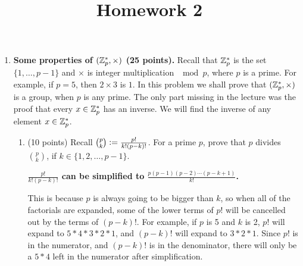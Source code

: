 \documentclass[11pt]{article}
\begin{document}
\title{Homework 2}

\date{}

\maketitle 

\thispagestyle{fancy}  
\pagestyle{fancy}      



\begin{enumerate}
\item {\bfseries Some properties of $({\mathbb Z}_p^*,\times)$ (25 points).} 
  Recall that ${\mathbb Z}_p^*$ is the set $\{1,\dotsc,p-1\}$ and $\times$ is integer multiplication $\mod p$, where $p$ is a prime. 
  For example, if $p=5$, then $2\times 3$ is $1$. 
  In this problem we shall prove that $({\mathbb Z}_p^*,\times)$ is a group, when $p$ is any prime. 
  The only part missing in the lecture was the proof that every $x\in{\mathbb Z}_p^*$ has an inverse. 
  We will find the inverse of any element $x\in{\mathbb Z}_p^*$. 
  \begin{enumerate}
  \item(10 points) Recall $\binom pk {\;\vcentcolon=\;} \frac{p!}{k!(p-k)!}$. 
    For a prime $p$, prove that $p$ divides $\binom pk$, if $k\in\{1,2,\dotsc,p-1\}$. \newline
  {\bfseries
      \newline
      \newline
      $\frac{p!}{k!(p-k)!}$ can be simplified to $\frac{p(p-1)(p-2)\dotsi(p-k+1)}{k!}$. \newline
      \newline

      This is because $p$ is always going to be bigger than $k$, so when all of the factorials are expanded, some of the lower terms of $p!$ will be cancelled out by the terms of $(p-k)!$. For example, if $p$ is 5 and $k$ is 2, $p!$ will expand to $5*4*3*2*1$, and $(p-k)!$ will expand to $3*2*1$. Since $p!$ is in the numerator, and $(p-k)!$ is in the denominator, there will only be a $5*4$ left in the numerator after simplification. \newline
      \newline

}
\end{enumerate}
\end{enumerate}
\end{document}
